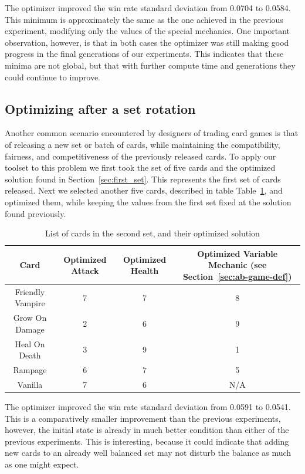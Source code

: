 The optimizer improved the win rate standard deviation from 0.0704 to 0.0584. This minimum is approximately the same as the one achieved in the previous experiment, modifying only the values of the special mechanics. One important observation, however, is that in both cases the optimizer was still making good progress in the final generations of our experiments. This indicates that these minima are not global, but that with further compute time and generations they could continue to improve.

\subsection{Optimizing after a set rotation}

Another common scenario encountered by designers of trading card games is that of releasing a new set or batch of cards, while maintaining the compatibility, fairness, and competitiveness of the previously released cards. To apply our toolset to this problem we first took the set of five cards and the optimized solution found in Section~\ref{sec:first_set}. This represents the first set of cards released. Next we selected another five cards, described in table Table~\ref{tab:second_set}, and optimized them, while keeping the values from the first set fixed at the solution found previously. 


\begin{table}[t]
\centering
\begin{tabular}{||c c c c||} 
 \hline
 Card & Optimized Attack & Optimized Health & Optimized Variable Mechanic (see Section~\ref{sec:ab-game-def})\\ [0.5ex]
 \hline
 Friendly Vampire & 7 & 7 & 8 \\
 \hline
 Grow On Damage & 2 & 6 & 9 \\
 \hline
 Heal On Death & 3 & 9 & 1 \\
 \hline
 Rampage & 6 & 7 & 5 \\ 
 \hline
 Vanilla & 7 & 6 & N/A \\
 \hline
\end{tabular}
\caption{List of cards in the second set, and their optimized solution}
\label{tab:second_set}
\end{table}

The optimizer improved the win rate standard deviation from 0.0591 to 0.0541. This is a comparatively smaller improvement than the previous experiments, however, the initial state is already in much better condition than either of the previous experiments. This is interesting, because it could indicate that adding new cards to an already well balanced set may not disturb the balance as much as one might expect. 


